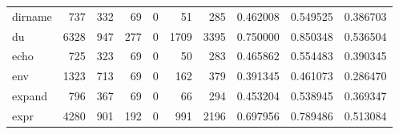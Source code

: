 \begin{tabular}{lrrrrrrrrr}
dirname   &                                                737 &                                                332 &                                                 69 &                                                  0 &                                                 51 &                                                285 &                                           0.462008 &                               0.549525 &                             0.386703 \\
du        &                                               6328 &                                                947 &                                                277 &                                                  0 &                                               1709 &                                               3395 &                                           0.750000 &                               0.850348 &                             0.536504 \\
echo      &                                                725 &                                                323 &                                                 69 &                                                  0 &                                                 50 &                                                283 &                                           0.465862 &                               0.554483 &                             0.390345 \\
env       &                                               1323 &                                                713 &                                                 69 &                                                  0 &                                                162 &                                                379 &                                           0.391345 &                               0.461073 &                             0.286470 \\
expand    &                                                796 &                                                367 &                                                 69 &                                                  0 &                                                 66 &                                                294 &                                           0.453204 &                               0.538945 &                             0.369347 \\
expr      &                                               4280 &                                                901 &                                                192 &                                                  0 &                                                991 &                                               2196 &                                           0.697956 &                               0.789486 &                             0.513084 \\

\end{tabular}
